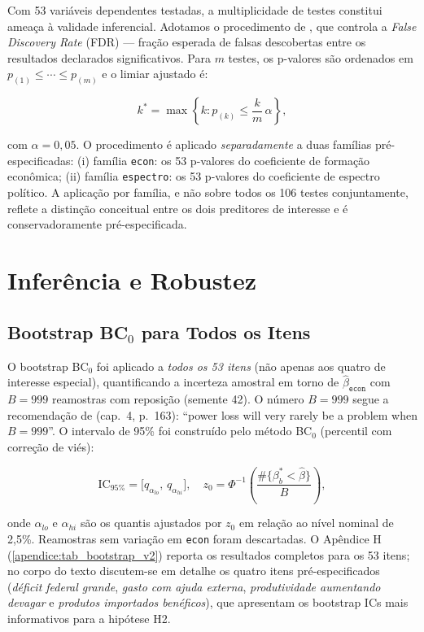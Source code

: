 Com 53 variáveis dependentes testadas, a multiplicidade de testes constitui ameaça à validade inferencial. Adotamos o procedimento de , que controla a \textit{False Discovery Rate} (FDR) — fração esperada de falsas descobertas entre os resultados declarados significativos. Para $m$ testes, os p-valores são ordenados em $p_{(1)} \leq \cdots \leq p_{(m)}$ e o limiar ajustado é:

\begin{equation}\label{eq:bh_v2}
k^{*} = \max\!\left\{k : p_{(k)} \leq \frac{k}{m}\,\alpha\right\},
\end{equation}

com $\alpha = 0{,}05$. O procedimento é aplicado \textit{separadamente} a duas famílias pré-especificadas: (i) família \texttt{econ}: os 53 p-valores do coeficiente de formação econômica; (ii) família \texttt{espectro}: os 53 p-valores do coeficiente de espectro político. A aplicação por família, e não sobre todos os 106 testes conjuntamente, reflete a distinção conceitual entre os dois preditores de interesse e é conservadoramente pré-especificada.

\section{Inferência e Robustez}\label{sec:inferencia-robustez}

\subsection{Bootstrap BC\texorpdfstring{$_0$}{0} para Todos os Itens}\label{sec:bootstrap_v2}

O bootstrap BC$_0$ foi aplicado a \textit{todos os 53 itens} (não apenas aos quatro de interesse especial), quantificando a incerteza amostral em torno de $\hat{\beta}_{\texttt{econ}}$ com $B = 999$ reamostras com reposição (semente 42). O número $B = 999$ segue a recomendação de  (cap.~4, p.~163): ``power loss will very rarely be a problem when $B = 999$''. O intervalo de 95\% foi construído pelo método BC$_0$ (percentil com correção de viés):

\begin{equation}\label{eq:bc0}
\mathrm{IC}_{95\%} = \bigl[q_{\alpha_{lo}},\, q_{\alpha_{hi}}\bigr],\quad
z_0 = \Phi^{-1}\!\left(\frac{\#\{\beta^*_b < \hat{\beta}\}}{B}\right),
\end{equation}

onde $\alpha_{lo}$ e $\alpha_{hi}$ são os quantis ajustados por $z_0$ em relação ao nível nominal de 2{,}5\%. Reamostras sem variação em \texttt{econ} foram descartadas. O Apêndice H (\autoref{apendice:tab_bootstrap_v2}) reporta os resultados completos para os 53 itens; no corpo do texto discutem-se em detalhe os quatro itens pré-especificados (\textit{déficit federal grande}, \textit{gasto com ajuda externa}, \textit{produtividade aumentando devagar} e \textit{produtos importados benéficos}), que apresentam os bootstrap ICs mais informativos para a hipótese H2.

